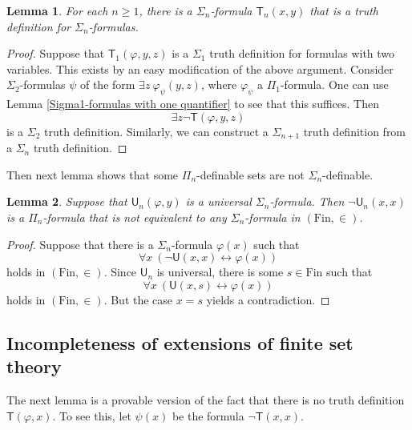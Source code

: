 \documentclass[a4paper, 11pt]{amsart}
\newtheorem{lemma}[lemma]{Lemma}
\theoremstyle{remark}
\newcommand{\Fin}{\mathrm{Fin}}
\begin{document}
\begin{lemma} 
For each $n\geq1$, 
there is a $\Sigma_n$-formula $\mathsf{T}_n(x,y)$ that is a truth definition for $\Sigma_n$-formulas. 
\end{lemma} 
\begin{proof} 
Suppose that $\mathsf{T}_1(\varphi,y,z)$ is a $\Sigma_1$ truth definition for formulas with two variables. 
This exists by an easy modification of the above argument. 
Consider $\Sigma_2$-formulas $\psi$ of the form $\exists z\ \varphi_\psi(y,z)$, where $\varphi_\psi$ a $\Pi_1$-formula. 
One can use Lemma \ref{Sigma1-formulas with one quantifier} to see that this suffices. 
Then 
$$ \exists z \neg\mathsf{T}(\varphi,y,z) $$ 
is a $\Sigma_2$ truth definition. 
Similarly, we can construct a $\Sigma_{n+1}$ truth definition from a $\Sigma_n$ truth definition. 
\end{proof} 

Then next lemma shows that some $\Pi_n$-definable sets are not $\Sigma_n$-definable. 

\begin{lemma} 
Suppose that $\mathsf{U}_n(\varphi,y)$ is a universal $\Sigma_n$-formula. 
Then $\neg \mathsf{U}_n(x,x)$ is a $\Pi_n$-formula that is not equivalent to any $\Sigma_n$-formula in $(\Fin,\in)$. 
\end{lemma} 
\begin{proof} 
Suppose that there is a $\Sigma_n$-formula $\varphi(x)$ such that 
$$ \forall x\ (\neg \mathsf{U}(x,x) \leftrightarrow   \varphi(x))  $$ 
holds in $(\Fin,\in)$. 
Since $\mathsf{U}_n$ is universal, there is some $s\in \Fin$ such that 
$$ \forall x\ (\mathsf{U}(x,s) \leftrightarrow   \varphi(x))  $$ 
holds in $(\Fin,\in)$. 
But the case $x=s$ yields a contradiction. 
\end{proof} 





\subsection{Incompleteness of extensions of finite set theory} 


The next lemma is a provable version of the fact that there is no truth definition $\mathsf{T}(\varphi,x)$. 
To see this, let $\psi(x)$ be the formula $\neg\mathsf{T}(x,x)$. 
\end{document}
